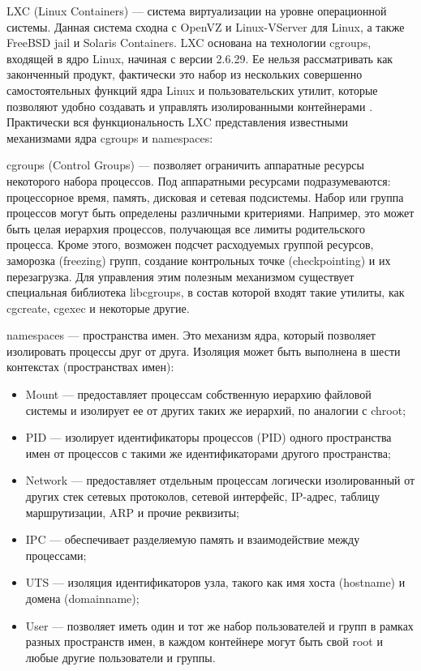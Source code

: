 LXC (Linux Containers) --- система виртуализации на уровне операционной системы.
Данная система сходна с OpenVZ и Linux-VServer для Linux, а также FreeBSD jail и Solaris Containers.
LXC основана на технологии cgroups, входящей в ядро Linux, начиная с версии 2.6.29.
Ее нельзя рассматривать как законченный продукт, фактически это набор из нескольких совершенно самостоятельных функций ядра Linux и пользовательских утилит, которые позволяют удобно создавать и управлять изолированными контейнерами \cite{lxc}.
Практически вся функциональность LXC представления известными механизмами ядра cgroups и namespaces:

cgroups (Control Groups) --- позволяет ограничить аппаратные ресурсы некоторого набора процессов.
Под аппаратными ресурсами подразумеваются: процессорное время, память, дисковая и сетевая подсистемы.
Набор или группа процессов могут быть определены различными критериями.
Например, это может быть целая иерархия процессов, получающая все лимиты родительского процесса.
Кроме этого, возможен подсчет расходуемых группой ресурсов, заморозка (freezing) групп, создание контрольных точке (checkpointing) и их перезагрузка.
Для управления этим полезным механизмом существует специальная библиотека libcgroups, в состав которой входят такие утилиты, как cgcreate, cgexec и некоторые другие.

namespaces --- пространства имен.
Это механизм ядра, который позволяет изолировать процессы друг от друга.
Изоляция может быть выполнена в шести контекстах (пространствах имен):
\begin{itemize}
  \item Mount --- предоставляет процессам собственную иерархию файловой системы и изолирует ее от других таких же иерархий, по аналогии с chroot;
  \item PID --- изолирует идентификаторы процессов (PID) одного пространства имен от процессов с такими же идентификаторами другого пространства;
  \item Network --- предоставляет отдельным процессам логически изолированный от других стек сетевых протоколов, сетевой интерфейс, IP-адрес, таблицу маршрутизации, ARP и прочие реквизиты;
  \item IPC --- обеспечивает разделяемую память и взаимодействие между процессами;
  \item UTS --- изоляция идентификаторов узла, такого как имя хоста (hostname) и домена (domainname);
  \item User --- позволяет иметь один и тот же набор пользователей и групп в рамках разных пространств имен, в каждом контейнере могут быть свой root и любые другие пользователи и группы.
\end{itemize}

